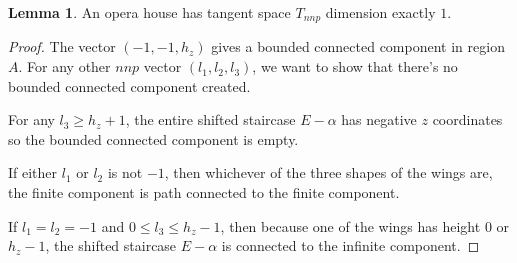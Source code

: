 \documentclass{amsart}[10pt]
\theoremstyle{plain}
\theoremstyle{definition}
\newtheorem{lemma}[theorem]{Lemma}
\begin{document}
\begin{lemma}
An opera house has tangent space $T_{nnp}$ dimension exactly $1$.
\end{lemma}

\begin{proof}
The vector $(-1, -1, h_z)$ gives a bounded connected component in region $A$. For any other $nnp$ vector $(l_1, l_2, l_3)$, we want to show that there's no bounded connected component created.

For any $l_3 \geq h_z+1$, the entire shifted staircase $E -\alpha$ has negative $z$ coordinates so the bounded connected component is empty.

If either $l_1$ or $l_2$ is not $-1$, then whichever of the three shapes of the wings are, the finite component is path connected to the finite component. 

If $l_1=l_2=-1$ and $0 \leq l_3 \leq h_z-1$, then because one of the wings has height $0$ or $h_z-1$, the shifted staircase $E -\alpha$ is connected to the infinite component.
\end{proof}





\end{document}
